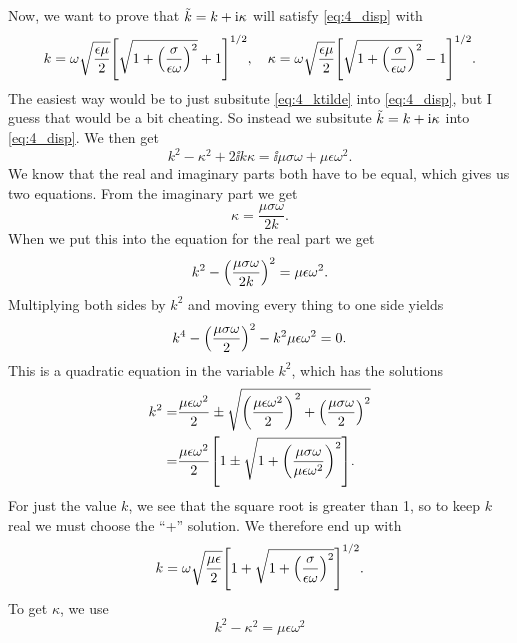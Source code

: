 \documentclass[11pt,letter, swedish, english
]{article}
\begin{document}
Now, we want to prove that $\tilde{k}=k+\mathrm{i}\kappa$ will satisfy
\eqref{eq:4_disp} with
\begin{equation}\label{eq:4_ktilde}
k=\omega\sqrt{\frac{\epsilon\mu}{2}}
\qty[\sqrt{1+\qty(\frac{\sigma}{\epsilon\omega})^2}+1]^{1/2}
\qcomma
\kappa=\omega\sqrt{\frac{\epsilon\mu}{2}}
\qty[\sqrt{1+\qty(\frac{\sigma}{\epsilon\omega})^2}-1]^{1/2}.
\end{equation}
The easiest way would be to just subsitute \eqref{eq:4_ktilde} into
\eqref{eq:4_disp}, but I guess that would be a bit cheating. So
instead we subsitute $\tilde{k}=k+\mathrm{i}\kappa$ into \eqref{eq:4_disp}. We then
get
\begin{equation}
k^2-\kappa^2 + 2\ii k\kappa 
= \ii\mu\sigma\omega +\mu\epsilon\omega^2.
\end{equation}
We know that the real and imaginary parts both have to be equal, which
gives us two equations. From the imaginary part we get
\begin{equation}
\kappa=\frac{\mu\sigma\omega}{2k}.
\end{equation}
When we put this into the equation for the real part we get
\begin{equation}
k^2- \qty(\frac{\mu\sigma\omega}{2k})^2
= \mu\epsilon\omega^2.
\end{equation}
Multiplying both sides by $k^2$ and moving every thing to one side
yields 
\begin{equation}
k^4- \qty(\frac{\mu\sigma\omega}{2})^2
- k^2\mu\epsilon\omega^2 =0.
\end{equation}
This is a quadratic equation in the variable $k^2$, which has the
solutions
\begin{equation}\label{eq:4_k2}
\begin{aligned}
k^2 =& \frac{\mu\epsilon\omega^2}{2}
\pm\sqrt{
\qty(\frac{\mu\epsilon\omega^2}{2})^2 
+ \qty(\frac{\mu\sigma\omega}{2})^2   }\\
=& \frac{\mu\epsilon\omega^2}{2}
\qty[ 1 \pm\sqrt{
1+ \qty(\frac{\mu\sigma\omega}{\mu\epsilon\omega^2})^2
} ].
\end{aligned}
\end{equation}
For just the value $k$, we see that the square root is greater than 1,
so to keep $k$ real we must choose the ``+'' solution. We therefore
end up with
\begin{equation}
k = \omega\sqrt{\frac{\mu\epsilon}{2}}
\qty[ 1 +\sqrt{
1+ \qty(\frac{\sigma}{\epsilon\omega})^2
} ]^{1/2}.
\end{equation}
To get $\kappa$, we use 
\begin{equation}
k^2-\kappa^2 = \mu\epsilon\omega^2
\end{equation}
\end{document}
